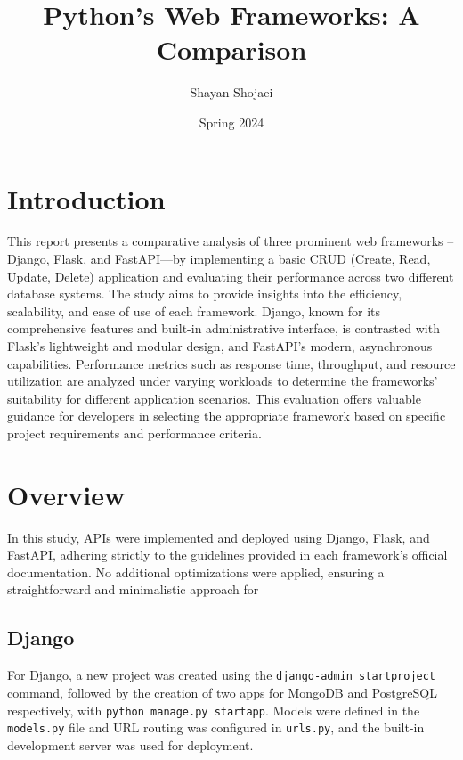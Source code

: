 \documentclass[12pt,onecolumn,a4paper,titlepage]{article}
\begin{document}
\title{Python's Web Frameworks: A Comparison} 
\author{Shayan Shojaei}
\date{Spring 2024}
\maketitle

\tableofcontents

\pagebreak

\section{Introduction}
This report presents a comparative analysis of three prominent web
frameworks --Django, Flask, and FastAPI—by implementing a basic CRUD
(Create, Read, Update, Delete) application and evaluating their
performance across two different database systems. The study aims
to provide insights into the efficiency, scalability, and ease of
use of each framework. Django, known for its comprehensive features
and built-in administrative interface, is contrasted with Flask's
lightweight and modular design, and FastAPI's modern, asynchronous
capabilities. Performance metrics such as response time, throughput,
and resource utilization are analyzed under varying workloads to
determine the frameworks' suitability for different application
scenarios. This evaluation offers valuable guidance for developers
in selecting the appropriate framework based on specific project
requirements and performance criteria.


\pagebreak

\section{Overview}
In this study, APIs were implemented and deployed using Django,
Flask, and FastAPI, adhering strictly to the guidelines provided
in each framework's official documentation. No additional optimizations
were applied, ensuring a straightforward and minimalistic approach for

\subsection*{Django}

For Django, a new project was created using the \lstinline{django-admin startproject}
command, followed by the creation of two apps for MongoDB and PostgreSQL respectively,
with \lstinline{python manage.py startapp}. Models were defined in the \lstinline{models.py} file and
URL routing was configured in \lstinline{urls.py}, and the built-in development server
was used for deployment.
\end{document}
